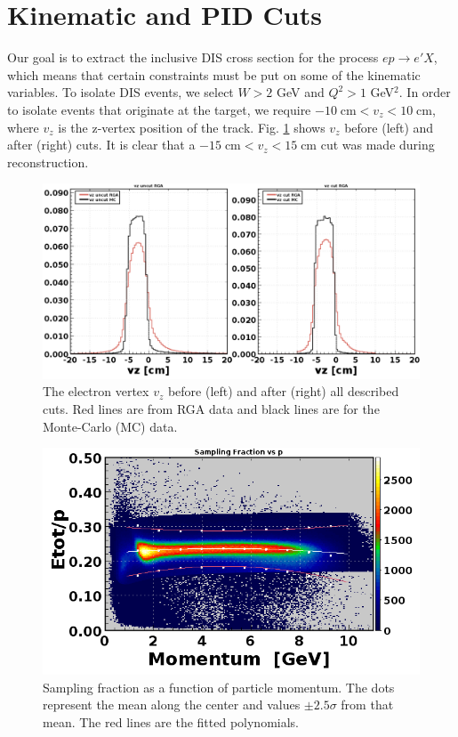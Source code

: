 \section{Kinematic and PID Cuts}
\label{sec:cuts}
Our goal is to extract the inclusive DIS cross section for the process $ep \longrightarrow e'X$, which means that certain constraints must be put on some of the kinematic variables. To isolate DIS events, we select $W>2$ GeV and $Q^2>1$ GeV$^2$. In order to isolate events that originate at the target, we require $-10 \; \mathrm{cm} < v_z < 10 \; \mathrm{cm}$, where $v_z$ is the z-vertex position of the track. Fig. \ref{fig:rga_vz} shows $v_z$ before (left) and after (right) cuts. It is clear that a $-15 \; \mathrm{cm} < v_z < 15 \; \mathrm{cm}$ cut was made during reconstruction.

\begin{figure}[h!]
	\centering
	\includegraphics[width=0.9\linewidth]{figures/rga/vz.png}
	\caption{The electron vertex $v_z$ before (left) and after (right) all described cuts. Red lines are from RGA data and black lines are for the Monte-Carlo (MC) data.}
	\label{fig:rga_vz}
\end{figure}

\begin{figure}[h!]
	\centering
	\includegraphics[width=0.9\linewidth]{figures/rga/fit_etot_p.png}
	\caption{Sampling fraction as a function of particle momentum. The dots represent the mean along the center and values $\pm2.5\sigma$ from that mean. The red lines are the fitted polynomials.}
	\label{fig:rga_etot_p}
\end{figure}


